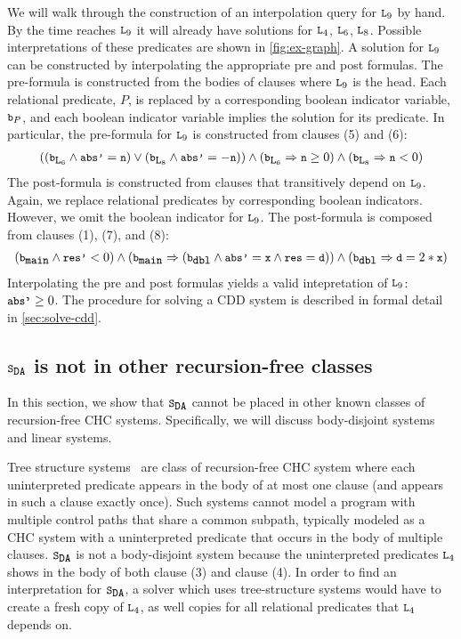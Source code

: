 We will walk through the construction of an interpolation query for
$\cc{L}_9$ by hand.  By the time \sys reaches $\cc{L}_9$ it will
already have solutions for $\cc{L}_4$, $\cc{L}_6$, $\cc{L}_8$.
Possible interpretations of these predicates are shown in
\autoref{fig:ex-graph}.
%
A solution for $\cc{L}_9$ can be constructed by interpolating
the appropriate pre and post formulas.
%
The pre-formula is constructed from the bodies of clauses where
$\cc{L}_9$ is the head. Each relational
predicate, $P$,
is replaced by a corresponding boolean indicator variable, $\cc{b}_P$, and each
boolean indicator variable implies the solution for its predicate.
%
In particular, the pre-formula for $\cc{L}_9$ is constructed from
clauses (5) and (6):
\begin{gather}
  ((\cc{b}_{\cc{L}_6} \land \cc{abs'} = \cc{n})
  \lor
  (\cc{b}_{\cc{L}_8} \land \cc{abs'} = -\cc{n}))
  \land
  (\cc{b}_{\cc{L}_6} \Rightarrow \cc{n} \ge 0)
  \land
  (\cc{b}_{\cc{L}_8} \Rightarrow \cc{n} < 0)
\end{gather}
%
The post-formula is constructed from clauses that transitively depend
on $\cc{L}_9$. Again, we replace relational predicates by
corresponding boolean indicators. However, we omit the boolean indicator for
$\cc{L}_9$. The post-formula is composed from clauses (1), (7), and
(8):
\begin{gather}
  (\cc{b}_{\cc{main}} \land \cc{res'} < 0)
  \land
  (\cc{b}_{\cc{main}} \Rightarrow
    (\cc{b}_{\cc{dbl}}
    \land \cc{abs'}= \cc{x}
    \land \cc{res}=\cc{d} ))
  \land (\cc{b}_{\cc{dbl}} \Rightarrow \cc{d} = 2*\cc{x})
\end{gather}
%
Interpolating the pre and post formulas yields a valid intepretation
of $\cc{L}_9$: $\cc{abs'} \geq 0$.
The procedure for solving a CDD system is described in formal detail
in \autoref{sec:solve-cdd}.

\subsection{$\mcchc$ is not in other recursion-free classes}
\label{sec:not-in}
%
In this section, we show that $\mcchc$ cannot be placed in other
known classes of recursion-free CHC systems. Specifically, we will
discuss body-disjoint systems and linear systems.
%

Tree structure
systems~\cite{mcmillan14,bjorner13,heizmann10,rummer13a,rummer13b} are
class of recursion-free CHC system where each uninterpreted predicate
appears in the body of at most one clause (and appears in such a
clause exactly once).
%
Such systems cannot model a program with multiple control paths that
share a common subpath, typically modeled as a CHC system with a
uninterpreted predicate that occurs in the body of multiple clauses.
%
$\mcchc$ is not a body-disjoint system because the uninterpreted
predicates $\cc{L}_4$ shows in the body of both clause (3) and clause
(4).
%
In order to find an interpretation for $\mcchc$, a solver which uses
tree-structure systems would have to create a fresh copy of
$\cc{L}_4$, as well copies for all relational predicates that
$\cc{L}_4$ depends on.

